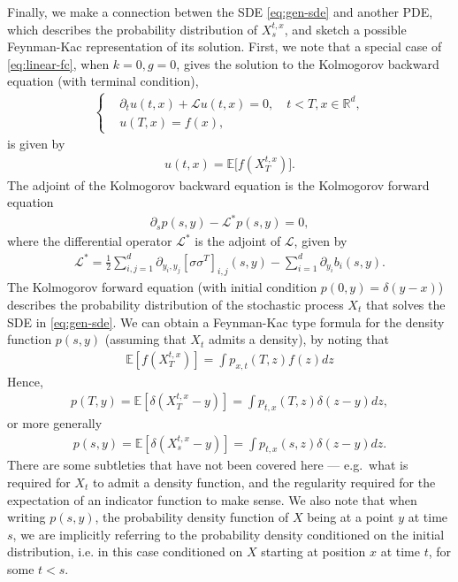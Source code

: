Finally, we make a connection betwen the SDE \autoref{eq:gen-sde} and another PDE, which describes the probability distribution of $X_s^{t,x}$, and sketch a possible Feynman-Kac representation of its solution. First, we note that a special case of \autoref{eq:linear-fc}, when $k=0,g=0$, gives the solution to the Kolmogorov backward equation (with terminal condition),
%
\begin{align}
    \label{eq:kolmogorov-backward}
    \begin{cases}
    &\partial_t u(t,x) + \mathcal{L}u(t,x) = 0, \quad t<T,x \in \mathbb{R}^d, \\
    &u(T,x) = f(x),
    \end{cases}
\end{align}
%
is given by 
%
\begin{align}
    u(t,x) = \mathbb{E}\big[ f(X_T^{t,x}) \big]. 
\end{align} 
% 
The adjoint of the Kolmogorov backward equation is the Kolmogorov forward equation
%
\begin{align} %
    \label{eq:kolmogorov-forward}
    \partial_s p(s,y) - \mathcal{L}^{*}p(s,y) = 0,
\end{align}
%
where the differential operator $\mathcal{L}^{*}$ is the adjoint of $\mathcal{L}$, given by
%
\begin{align}
    \label{eq:adjoint-operator}
     \mathcal{L}^{*} = \frac{1}{2} \sum_{i,j=1}^{d} \partial_{y_i,y_j} [\sigma \sigma^T]_{i,j}(s,y) - \sum_{i=1}^{d} \partial_{y_i}b_i(s,y).
\end{align} 
%
The Kolmogorov forward equation (with initial condition $p(0,y)=\delta(y-x)$) describes the probability distribution of the stochastic process $X_t$ that solves the SDE in \autoref{eq:gen-sde}. We can obtain a Feynman-Kac type formula for the density function $p(s,y)$ (assuming that $X_t$ admits a density), by noting that
%
\begin{align} 
    \mathbb{E}[f(X_T^{t,x})] = \int p_{x,t}(T,z)f(z)dz 
\end{align}
%
Hence,
%
\begin{align}
    p(T,y) = \mathbb{E}[\delta({X_T^{t,x} - y})] = \int p_{t,x}(T,z)\delta({z-y})dz, 
\end{align} 
%
or more generally
%
\begin{align}
    p(s,y) = \mathbb{E}[\delta({X_s^{t,x} - y})] = \int p_{t,x}(s,z)\delta({z-y})dz.
\end{align} 
%
There are some subtleties that have not been covered here --- e.g.\ what is required for $X_t$ to admit a density function, and the regularity required for the expectation of an indicator function to make sense. We also note that when writing $p(s,y)$, the probability density function of $X$ being at a point $y$ at time $s$, we are implicitly referring to the probability density conditioned on the initial distribution, i.e. in this case conditioned on $X$ starting at position $x$ at time $t$, for some $t<s$.


